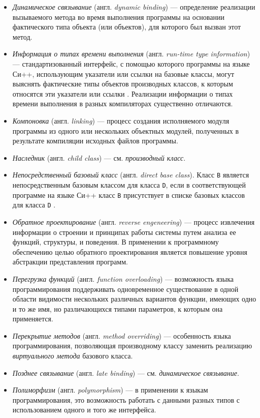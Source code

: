 \begin{itemize}
\item {\it Динамическое связывание} (англ. {\it dynamic binding}) --- определение реализации вызываемого метода во время выполнения программы на основании фактического типа объекта (или объектов), для которого был вызван этот метод.
\item {\it Информация о типах времени выполнения} (англ. {\it run-time type information})--- стандартизованный интерфейс, с помощью которого программы на языке Си++, использующим указатели или ссылки на базовые классы, могут выяснять фактические типы объектов производных классов, к которым относятся эти указатели или ссылки \cite{lippman07ru}. Реализации информации о типах времени выполнения в разных компиляторах существенно отличаются.
\item {\it Компоновка} (англ. {\it linking}) --- процесс создания исполняемого модуля программы из одного или нескольких объектных модулей, полученных в результате компиляции исходных файлов программы.
\item {\it Наследник} (англ. {\it child class}) --- см. {\it производный класс}.
\item {\it Непосредственный базовый класс} (англ. {\it direct base class}). Класс \lstinline{B} является непосредственным базовым классом для класса \lstinline{D}, если в соответствующей программе на языке Си++ класс \lstinline{B} присутствует в списке базовых классов для класса \lstinline{D} \cite{cpp03}.%
\item {\it Обратное проектирование} (англ. {\it reverse engeneering}) --- процесс извлечения информации о строении и принципах работы системы путем анализа ее функций, структуры, и поведения. В применении к программному обеспечению целью обратного проектирования является повышение уровня абстракции представления программ.
\item {\it Перегрузка функций} (англ. {\it function overloading}) --- возможность языка программирования поддерживать одновременное существование в одной области видимости нескольких различных вариантов функции, имеющих одно и то же имя, но различающихся типами параметров, к которым она применяется.
\item {\it Перекрытие методов} (англ. {\it method overriding}) --- особенность языка программирования, позволяющая производному классу заменить реализацию {\it виртуального метода} базового класса.
\item {\it Позднее связывание} (англ. {\it late binding}) --- см. {\it динамическое связывание}.
\item {\it Полиморфизм} (англ. {\it polymorphism}) --- в применении к языкам программирования, это возможность работать с данными разных типов с использованием одного и того же интерфейса.

\end{itemize}
